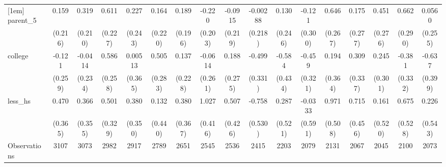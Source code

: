 {\begin{tabular}{l*{16}{c}}
[1em]
parent\_5            &       0.159         &       0.319         &       0.611\sym{**} &       0.227         &       0.164         &       0.189         &      -0.220         &     -0.0915         &    -0.00288         &       0.130         &      -0.121         &       0.646\sym{*}  &       0.175         &       0.451         &       0.662\sym{*}  &      0.0560         \\
                    &     (0.216)         &     (0.210)         &     (0.227)         &     (0.243)         &     (0.220)         &     (0.196)         &     (0.203)         &     (0.219)         &     (0.218)         &     (0.246)         &     (0.300)         &     (0.267)         &     (0.277)         &     (0.276)         &     (0.290)         &     (0.255)         \\
[1em]
college             &      -0.121         &     -0.0414         &       0.586\sym{*}  &     0.00513         &       0.505         &       0.137         &     -0.0614         &       0.188         &      -0.499         &      -0.584         &      -0.459         &       0.194         &       0.309         &       0.245         &      -0.381         &      -0.637         \\
                    &     (0.259)         &     (0.234)         &     (0.258)         &     (0.365)         &     (0.283)         &     (0.228)         &     (0.261)         &     (0.275)         &     (0.331)         &     (0.434)         &     (0.321)         &     (0.364)         &     (0.337)         &     (0.301)         &     (0.332)         &     (0.399)         \\
[1em]
less\_hs             &       0.470         &       0.366         &       0.501         &       0.380         &       0.132         &       0.380         &       1.027\sym{*}  &       0.507         &      -0.758         &       0.287         &     -0.0333         &       0.971         &       0.715         &       0.161         &       0.675         &       0.226         \\
                    &     (0.365)         &     (0.355)         &     (0.329)         &     (0.350)         &     (0.440)         &     (0.367)         &     (0.416)         &     (0.426)         &     (0.530)         &     (0.521)         &     (0.591)         &     (0.508)         &     (0.456)         &     (0.520)         &     (0.528)         &     (0.543)         \\
\hline
Observations        &        3107         &        3073         &        2982         &        2917         &        2789         &        2651         &        2545         &        2536         &        2415         &        2203         &        2079         &        2131         &        2067         &        2045         &        2100         &        2073         \\

\end{tabular}}
